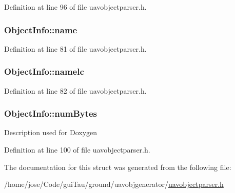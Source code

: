Definition at line 96 of file uavobjectparser.\-h.

\hypertarget{struct_object_info_aae920cf301d814ac2025a0c03ee1aed9}{
\subsubsection[{name}]{ Object\-Info\-::name}}\label{struct_object_info_aae920cf301d814ac2025a0c03ee1aed9}


Definition at line 81 of file uavobjectparser.\-h.

\hypertarget{struct_object_info_ad963c87ba31990cb3c21da5dbab6541d}{
\subsubsection[{namelc}]{ Object\-Info\-::namelc}}\label{struct_object_info_ad963c87ba31990cb3c21da5dbab6541d}


Definition at line 82 of file uavobjectparser.\-h.

\hypertarget{struct_object_info_addb6314d2fbbf790c27313fce9f13b98}{
\subsubsection[{num\-Bytes}]{ Object\-Info\-::num\-Bytes}}\label{struct_object_info_addb6314d2fbbf790c27313fce9f13b98}
Description used for Doxygen 

Definition at line 100 of file uavobjectparser.\-h.



The documentation for this struct was generated from the following file\-:\begin{DoxyCompactItemize}
\item 
/home/jose/\-Code/gui\-Tau/ground/uavobjgenerator/\hyperlink{uavobjectparser_8h}{uavobjectparser.\-h}\end{DoxyCompactItemize}
